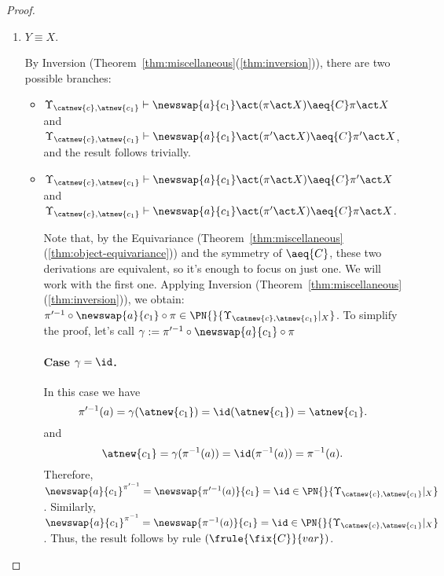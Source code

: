 \begin{proof}
\begin{description}
\begin{enumerate}
\begin{enumerate}
            \item $Y\equiv X$.

            By Inversion (Theorem~\ref{thm:miscellaneous}(\ref{thm:inversion})), there are two possible branches:
            \begin{itemize}
               \item $\Upsilon_{\catnew{c},\atnew{c_1}}\vdash \newswap{a}{c_1}\act(\pi\act X) \aeq{C}\pi\act X$ and $\Upsilon_{\catnew{c},\atnew{c_1}}\vdash \newswap{a}{c_1}\act(\pi'\act X)\aeq{C}\pi'\act X$, and the result follows trivially.


            \item $\Upsilon_{\catnew{c},\atnew{c_1}}\vdash \newswap{a}{c_1}\act(\pi\act X)\aeq{C}\pi'\act X$ and $\Upsilon_{\catnew{c},\atnew{c_1}}\vdash \newswap{a}{c_1}\act(\pi'\act X)\aeq{C}\pi\act X$.

            Note that, by the Equivariance (Theorem~\ref{thm:miscellaneous}(\ref{thm:object-equivariance})) and the symmetry of $\aeq{C}$, these two derivations are equivalent, so it's enough to focus on just one. We will work with the first one. Applying Inversion (Theorem~\ref{thm:miscellaneous}(\ref{thm:inversion})), we obtain: $\pi'^{-1} \circ\newswap{a}{c_1}\circ \pi\in \PN{}{\Upsilon_{\catnew{c},\atnew{c_1}}|_X}$. To simplify the proof, let's call $\gamma := \pi'^{-1} \circ\newswap{a}{c_1}\circ \pi$

            \paragraph*{Case  $\gamma = \id$.} In this case we have
            \[
               \pi'^{-1}(a)  = \gamma(\atnew{c_1}) = \id(\atnew{c_1}) = \atnew{c_1}.
            \]
            and
            \[
                \atnew{c_1}  = \gamma(\pi^{-1}(a)) = \id(\pi^{-1}(a)) = \pi^{-1}(a).
            \]
            Therefore, $\newswap{a}{c_1}^{\pi'^{-1}} =\newswap{\pi'^{-1}(a)}{c_1} = \id \in \PN{}{\Upsilon_{\catnew{c},\atnew{c_1}}|_X}$. Similarly, $\newswap{a}{c_1}^{\pi^{-1}} =\newswap{\pi^{-1}(a)}{c_1} = \id \in \PN{}{\Upsilon_{\catnew{c},\atnew{c_1}}|_X}$. Thus, the result follows by rule $(\frule{\fix{C}}{var})$.


\end{itemize}
\end{enumerate}
\end{enumerate}
\end{description}
\end{proof}
